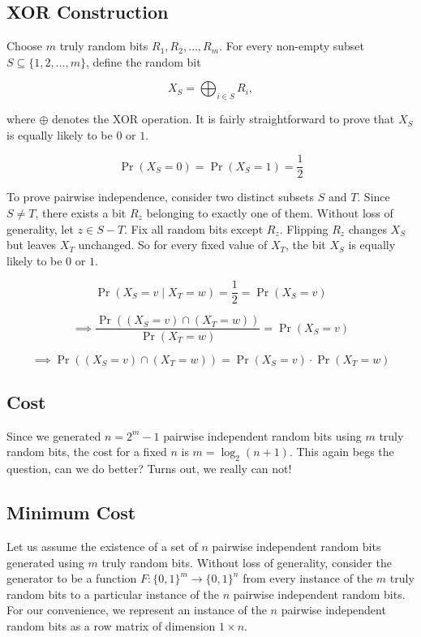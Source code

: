 \subsection{XOR Construction}
Choose $m$ truly random bits $R_1,R_2,\dots,R_m$. For every 
non-empty subset $S\subseteq\{1,2,\dots,m\}$, define the random bit

\[
X_S=\bigoplus_{i\in S}R_i,
\]

where $\oplus$ denotes the XOR operation. It is fairly straightforward to prove that $X_S$ is equally 
likely to be $0$ or $1$.

\[
\Pr(X_S=0)=\Pr(X_S=1)=\frac{1}{2}
\]

To prove pairwise independence, consider two distinct subsets
$S$ and $T$. Since $S\neq T$, there exists a bit $R_z$ belonging to exactly
one of them. Without loss of generality, let $z\in S - T$.
Fix all random bits except $R_z$. Flipping $R_z$ changes $X_S$ but leaves $X_T$ unchanged. So for every 
fixed value of $X_T$, the bit $X_S$ is equally likely to be $0$ or $1$.

\[
\Pr(X_S=v \;| \; X_T=w)=\frac12=\Pr(X_S=v)
\]

\[
\implies 
\frac{\Pr((X_S=v) \cap (X_T=w))}{\Pr(X_T=w)}=\Pr(X_S=v)
\]

\[
\implies 
\Pr((X_S=v) \cap (X_T=w))=\Pr(X_S=v)\cdot\Pr(X_T=w)
\]

\subsection*{Cost}
Since we generated $n=2^m-1$ pairwise independent random bits using $m$ truly random bits, the cost for a fixed 
$n$ is $m=\log_2(n+1)$. This again begs the question, can we do better? Turns out, we really can not!

\subsection{Minimum Cost}

Let us assume the existence of a set of $n$ pairwise independent random bits 
generated using $m$ truly random bits. Without loss of generality, consider the generator to be a function
$F:\{0,1\}^m \to \{0,1\}^n$ from every instance of the $m$ truly random bits to a particular instance of 
the $n$ pairwise independent random bits. For our convenience, we represent an instance of the $n$ pairwise 
independent random bits as a row matrix of dimension $1\times n$.\\

